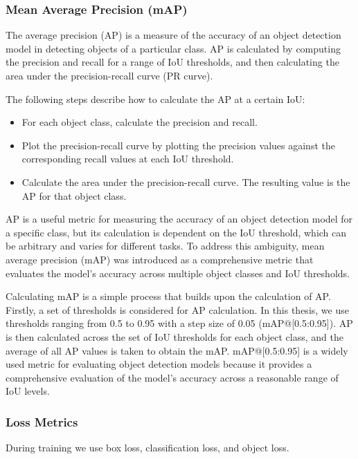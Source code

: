 \subsubsection{Mean Average Precision (mAP)} \label{mAP}
The average precision (AP) is a measure of the accuracy of an object detection model in detecting objects of a particular class. AP is calculated by computing the precision and recall for a range of IoU thresholds, and then calculating the area under the precision-recall curve (PR curve).

The following steps describe how to calculate the AP at a certain IoU:
\begin{itemize}
    \item For each object class, calculate the precision and recall.
    \item Plot the precision-recall curve by plotting the precision values against the corresponding recall values at each IoU threshold.
    \item Calculate the area under the precision-recall curve. The resulting value is the AP for that object class.
\end{itemize}

AP is a useful metric for measuring the accuracy of an object detection model for a specific class, but its calculation is dependent on the IoU threshold, which can be arbitrary and varies for different tasks. To address this ambiguity, mean average precision (mAP) was introduced as a comprehensive metric that evaluates the model's accuracy across multiple object classes and IoU thresholds.

Calculating mAP is a simple process that builds upon the calculation of AP. Firstly, a set of thresholds is considered for AP calculation. In this thesis, we use thresholds ranging from 0.5 to 0.95 with a step size of 0.05 (mAP@[0.5:0.95]). AP is then calculated across the set of IoU thresholds for each object class, and the average of all AP values is taken to obtain the mAP. mAP@[0.5:0.95] is a widely used metric for evaluating object detection models because it provides a comprehensive evaluation of the model's accuracy across a reasonable range of IoU levels. 

\subsubsection{Loss Metrics}
During training we use box loss, classification loss, and object loss. 

